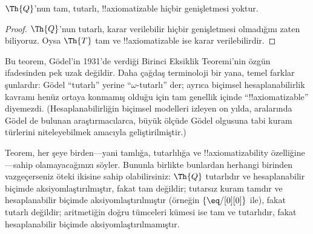 



\begin{thm}
$\Th{Q}$'nun tam, tutarlı, !!{axiomatizable} hiçbir genişletmesi yoktur.
\end{thm}

\begin{proof}
$\Th{Q}$'nun tutarlı, karar verilebilir hiçbir genişletmesi olmadığını zaten
biliyoruz. Oysa $\Th{T}$ tam ve !!{axiomatizable} ise karar verilebilirdir.
\end{proof}

\begin{explain}
Bu teorem, G\"odel'in 1931'de verdiği Birinci Eksiklik Teoremi'nin özgün
ifadesinden pek uzak değildir. Daha çağdaş terminoloji bir yana, temel
farklar şunlardır: G\"odel “tutarlı” yerine “$\omega$-tutarlı” der; ayrıca
biçimsel hesaplanabilirlik kavramı henüz ortaya konmamış olduğu için tam
genellik içinde “!!{axiomatizable}” diyemezdi. (Hesaplanabilirliğin biçimsel
modelleri izleyen on yılda, aralarında G\"odel de bulunan araştırmacılarca,
büyük ölçüde G\"odel olgusuna tabi kuram türlerini niteleyebilmek amacıyla
geliştirilmiştir.)

Teorem, her şeye birden---yani tamlığa, tutarlılığa ve
!!{axiomatizability} özelliğine---sahip olamayacağınızı söyler. Bununla
birlikte bunlardan herhangi birinden vazgeçerseniz öteki ikisine sahip
olabilirsiniz: $\Th{Q}$ tutarlıdır ve hesaplanabilir biçimde
aksiyomlaştırılmıştır, fakat tam değildir; tutarsız kuram tamdır ve
hesaplanabilir biçimde aksiyomlaştırılmıştır (örneğin
$\{ \eq/[0][0] \}$ ile), fakat tutarlı değildir; aritmetiğin doğru tümceleri
kümesi ise tam ve tutarlıdır, fakat hesaplanabilir biçimde
aksiyomlaştırılmamıştır.
\end{explain}
